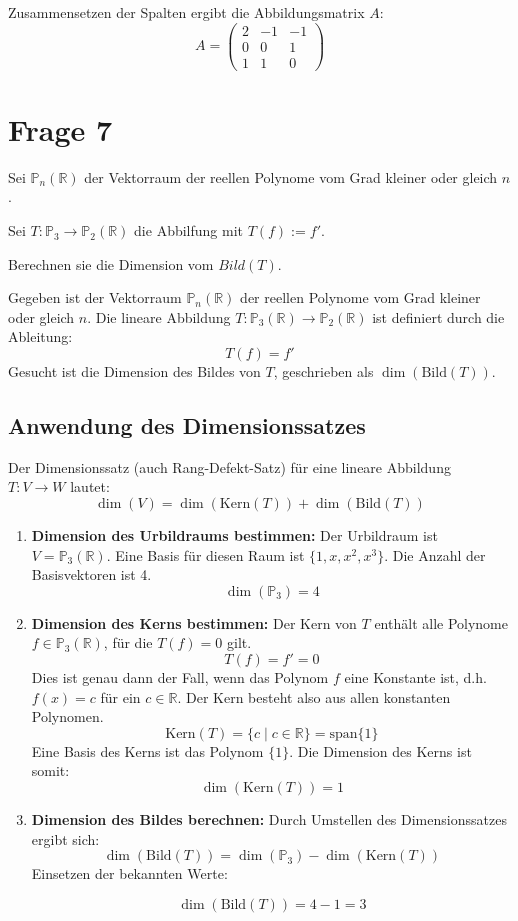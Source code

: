Zusammensetzen der Spalten ergibt die Abbildungsmatrix \(A\):
\[
    A = \begin{pmatrix} 2 & -1 & -1 \\ 0 & 0 & 1 \\ 1 & 1 & 0 \end{pmatrix}
\]

\section{Frage 7}

Sei $\mathbb{P}_n(\mathbb{R})$ der Vektorraum der reellen Polynome vom Grad
kleiner oder gleich $n$.

Sei $T : \mathbb{P}_3 \rightarrow \mathbb{P}_2(\mathbb{R})$ die Abbilfung mit
$T(f) := f'$.

Berechnen sie die Dimension vom $Bild(T)$.

Gegeben ist der Vektorraum $\mathbb{P}_n(\mathbb{R})$ der reellen Polynome vom
Grad kleiner oder gleich $n$. Die lineare Abbildung $T:
    \mathbb{P}_3(\mathbb{R}) \to \mathbb{P}_2(\mathbb{R})$ ist definiert durch die
Ableitung:
\[ T(f) = f' \]
Gesucht ist die Dimension des Bildes von $T$, geschrieben als
$\dim(\text{Bild}(T))$.

\subsection*{Anwendung des Dimensionssatzes}
Der Dimensionssatz (auch Rang-Defekt-Satz) für eine lineare Abbildung $T: V \to
    W$ lautet:
\[ \dim(V) = \dim(\text{Kern}(T)) + \dim(\text{Bild}(T)) \]

\begin{enumerate}
    \item \textbf{Dimension des Urbildraums bestimmen:}
          Der Urbildraum ist $V = \mathbb{P}_3(\mathbb{R})$. Eine Basis für diesen Raum ist $\{1, x, x^2, x^3\}$. Die Anzahl der Basisvektoren ist 4.
          \[ \dim(\mathbb{P}_3) = 4 \]

    \item \textbf{Dimension des Kerns bestimmen:}
          Der Kern von $T$ enthält alle Polynome $f \in \mathbb{P}_3(\mathbb{R})$, für die $T(f) = 0$ gilt.
          \[ T(f) = f' = 0 \]
          Dies ist genau dann der Fall, wenn das Polynom $f$ eine Konstante ist, d.h.
          $f(x) = c$ für ein $c \in \mathbb{R}$. Der Kern besteht also aus allen
          konstanten Polynomen.
          \[ \text{Kern}(T) = \{c \mid c \in \mathbb{R}\} = \text{span}\{1\} \]
          Eine Basis des Kerns ist das Polynom $\{1\}$. Die Dimension des Kerns ist
          somit:
          \[ \dim(\text{Kern}(T)) = 1 \]

    \item \textbf{Dimension des Bildes berechnen:}
          Durch Umstellen des Dimensionssatzes ergibt sich:
          \[ \dim(\text{Bild}(T)) = \dim(\mathbb{P}_3) - \dim(\text{Kern}(T)) \]
          Einsetzen der bekannten Werte:

          \[ \dim(\text{Bild}(T)) = 4 - 1 = 3 \]
\end{enumerate}
